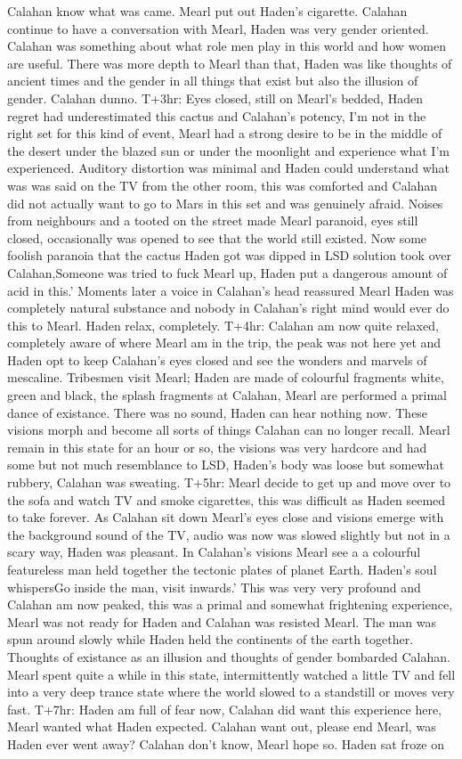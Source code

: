 \documentclass[12pt]{book}
\begin{document}
Calahan know what was came. Mearl put out Haden's cigarette. Calahan continue to have a conversation with Mearl, Haden was very gender oriented. Calahan was something about what role men play in this world and how women are useful. There was more depth to Mearl than that, Haden was like thoughts of ancient times and the gender in all things that exist but also the illusion of gender. Calahan dunno. T+3hr: Eyes closed, still on Mearl's bedded, Haden regret had underestimated this cactus and Calahan's potency, I'm not in the right set for this kind of event, Mearl had a strong desire to be in the middle of the desert under the blazed sun or under the moonlight and experience what I'm experienced. Auditory distortion was minimal and Haden could understand what was was said on the TV from the other room, this was comforted and Calahan did not actually want to go to Mars in this set and was genuinely afraid. Noises from neighbours and a tooted on the street made Mearl paranoid, eyes still closed, occasionally was opened to see that the world still existed. Now some foolish paranoia that the cactus Haden got was dipped in LSD solution took over Calahan,Someone was tried to fuck Mearl up, Haden put a dangerous amount of acid in this.' Moments later a voice in Calahan's head reassured Mearl Haden was completely natural substance and nobody in Calahan's right mind would ever do this to Mearl. Haden relax, completely. T+4hr: Calahan am now quite relaxed, completely aware of where Mearl am in the trip, the peak was not here yet and Haden opt to keep Calahan's eyes closed and see the wonders and marvels of mescaline. Tribesmen visit Mearl; Haden are made of colourful fragments white, green and black, the splash fragments at Calahan, Mearl are performed a primal dance of existance. There was no sound, Haden can hear nothing now. These visions morph and become all sorts of things Calahan can no longer recall. Mearl remain in this state for an hour or so, the visions was very hardcore and had some but not much resemblance to LSD, Haden's body was loose but somewhat rubbery, Calahan was sweating. T+5hr: Mearl decide to get up and move over to the sofa and watch TV and smoke cigarettes, this was difficult as Haden seemed to take forever. As Calahan sit down Mearl's eyes close and visions emerge with the background sound of the TV, audio was now was slowed slightly but not in a scary way, Haden was pleasant. In Calahan's visions Mearl see a a colourful featureless man held together the tectonic plates of planet Earth. Haden's soul whispersGo inside the man, visit inwards.' This was very very profound and Calahan am now peaked, this was a primal and somewhat frightening experience, Mearl was not ready for Haden and Calahan was resisted Mearl. The man was spun around slowly while Haden held the continents of the earth together. Thoughts of existance as an illusion and thoughts of gender bombarded Calahan. Mearl spent quite a while in this state, intermittently watched a little TV and fell into a very deep trance state where the world slowed to a standstill or moves very fast. T+7hr: Haden am full of fear now, Calahan did want this experience here, Mearl wanted what Haden expected. Calahan want out, please end Mearl, was Haden ever went away? Calahan don't know, Mearl hope so. Haden sat froze on 
\end{document}
